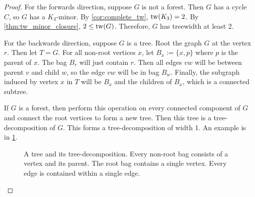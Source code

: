 \begin{proof}
	For the forwards direction, suppose $G$ is not a forest. Then \(G\) has a cycle \(C\), so $G$ has a $K_3$-minor. By \cref{cor:complete_tw}, $\operatorname{tw}(K_3) = 2$. By \cref{thm:tw_minor_closure}, $2 \leq \operatorname{tw}(G)$. Therefore, $G$ has treewidth at least 2. 

	For the backwards direction, suppose \(G\) is a tree. Root the graph \(G\) at the vertex \(r\). Then let \(T = G\). For all non-root vertices $x$, let \(B_x:= \lbrace x, p \rbrace\) where \(p\) is the parent of \(x\). The bag \(B_r\) will just contain \(r\). Then all edges \(vw\) will be between parent \(v\) and child \(w\), so the edge $vw$ will be in bag \(B_w\). Finally, the subgraph induced by vertex \(x\) in \(T\) will be \(B_x\) and the children of \(B_x\), which is a connected subtree.

	If \(G\) is a forest, then perform this operation on every connected component of \(G\) and connect the root vertices to form a new tree. Then this tree is a tree-decomposition of $G$. This forms a tree-decomposition of width 1. An example is in \cref{fig:tree-treedecomp}.
	\begin{figure}[ht]
		\centering
		
		
		\caption[Tree-decomposition of a tree]{A tree and its tree-decomposition. Every non-root bag consists of a vertex and its parent. The root bag contains a single vertex. Every edge is contained within a single edge.}\label{fig:tree-treedecomp}
	\end{figure}
\end{proof}

